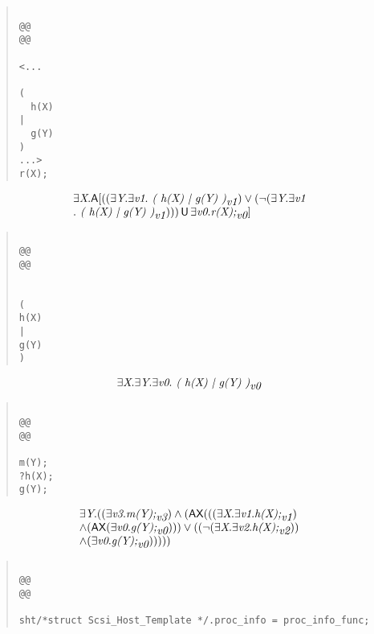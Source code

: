 \documentclass{article}
\newcommand{\U}{\,\mbox{\sf{U}}\,}
\newcommand{\A}{\mbox{\sf{A}}}
\newcommand{\AX}{\mbox{\sf{AX}}}
\newcommand{\mita}[1]{\mbox{\it{{#1}}}}
\begin{document}
\begin{quote}\begin{verbatim}

@@
@@

<...
  
(
  h(X)
|
  g(Y)
)
...>
r(X);
\end{verbatim}\end{quote}

\[\begin{array}{l}
\exists \mita{X} . \A[((\exists \mita{Y} . \exists \mita{v1} . \mita{
(
h(X)
|
g(Y)
)}_{\mita{v1}}) \vee (\neg (\exists \mita{Y} . \exists \mita{v1}\\ . \mita{
(
h(X)
|
g(Y)
)}_{\mita{v1}}))) \U \exists \mita{v0} . \mita{r(X);}_{\mita{v0}}]

\end{array}\]

\begin{quote}\begin{verbatim}

@@
@@


(
h(X)
|
g(Y)
)
\end{verbatim}\end{quote}

\[\begin{array}{l}
\exists \mita{X} . \exists \mita{Y} . \exists \mita{v0} . \mita{
(
h(X)
|
g(Y)
)}_{\mita{v0}}
\end{array}\]

\begin{quote}\begin{verbatim}

@@
@@

m(Y);
?h(X);
g(Y);
\end{verbatim}\end{quote}

\[\begin{array}{l}
\exists \mita{Y} . ((\exists \mita{v3} . \mita{m(Y);}_{\mita{v3}}) \wedge (\AX(((\exists \mita{X} . \exists \mita{v1} . \mita{h(X);}_{\mita{v1}})\\ \wedge (\AX(\exists \mita{v0} . \mita{g(Y);}_{\mita{v0}}))) \vee ((\neg (\exists \mita{X} . \exists \mita{v2} . \mita{h(X);}_{\mita{v2}}))\\ \wedge (\exists \mita{v0} . \mita{g(Y);}_{\mita{v0}})))))
\end{array}\]

\begin{quote}\begin{verbatim}

@@
@@

sht/*struct Scsi_Host_Template */.proc_info = proc_info_func;
\end{verbatim}\end{quote}
\end{document}
